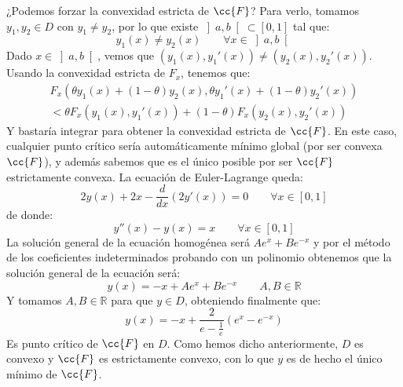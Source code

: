 \begin{ejemplo}
    \noindent
    ¿Podemos forzar la convexidad estricta de $\cc{F}$? Para verlo, tomamos $y_1,y_2\in D$ con $y_1\neq y_2$, por lo que existe $\left]a,b\right[\subset [0,1]$ tal que:
    \begin{equation*}
        y_1(x) \neq y_2(x) \qquad \forall x\in \left]a,b\right[
    \end{equation*}
    Dado $x\in \left]a,b\right[$, vemos que $(y_1(x),y_1'(x)) \neq (y_2(x),y_2'(x))$. Usando la convexidad estricta de $F_x$, tenemos que:
    \begin{multline*}
        F_x(\theta y_1(x) + (1-\theta)y_2(x), \theta y_1'(x) + (1-\theta)y_2'(x)) \\ < \theta F_x(y_1(x),y_1'(x)) + (1-\theta) F_x(y_2(x), y_2'(x))
    \end{multline*}
    Y bastaría integrar para obtener la convexidad estricta de $\cc{F}$. En este caso, cualquier punto crítico sería automáticamente mínimo global (por ser convexa $\cc{F}$), y además sabemos que es el único posible por ser $\cc{F}$ estrictamente convexa. La ecuación de Euler-Lagrange queda:
    \begin{equation*}
        2y(x) + 2x - \frac{d}{dx}(2y'(x)) = 0 \qquad \forall x\in [0,1]
    \end{equation*}
    de donde:
    \begin{equation*}
        y''(x )- y(x) = x \qquad \forall x\in [0,1]
    \end{equation*}
    La solución general de la ecuación homogénea será $Ae^x + Be^{-x}$ y por el método de los coeficientes indeterminados probando con un polinomio obtenemos que la solución general de la ecuación será:
    \begin{equation*}
        y(x) = -x + Ae^x + Be^{-x} \qquad A,B\in \mathbb{R}
    \end{equation*}
    Y tomamos $A,B\in \mathbb{R}$ para que $y\in D$, obteniendo finalmente que:
    \begin{equation*}
        y(x) = -x + \frac{2}{e-\frac{1}{e}} (e^x - e^{-x})
    \end{equation*}
    Es punto crítico de $\cc{F}$ en $D$. Como hemos dicho anteriormente, $D$ es convexo y $\cc{F}$ es estrictamente convexo, con lo que $y$ es de hecho el único mínimo de $\cc{F}$.
\end{ejemplo}


